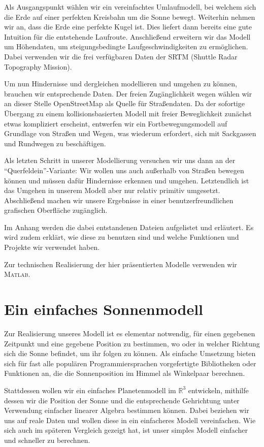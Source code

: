\documentclass[
    paper=a4,
    DIV14,
    fontsize=12pt,
    pagesize=pdftex,
    toc=bibliographynumbered
]{scrartcl}
\numberwithin{figure}{section}
\numberwithin{equation}{section}
\numberwithin{table}{section}
\newcommand*\setR{\mathds{R}}
\begin{document}
Als Ausgangspunkt wählen wir ein vereinfachtes Umlaufmodell, bei welchem sich die Erde
auf einer perfekten Kreisbahn um die Sonne bewegt. Weiterhin nehmen wir an, dass die Erde
eine perfekte Kugel ist. Dies liefert dann bereits eine gute Intuition für die
entstehende Laufroute. Anschließend erweitern wir das Modell um Höhendaten, um
steigungsbedingte Laufgeschwindigkeiten zu ermöglichen. Dabei verwenden wir die frei
verfügbaren Daten der SRTM (Shuttle Radar Topography Mission).

Um nun Hindernisse und dergleichen modellieren und umgehen zu können, brauchen wir
entsprechende Daten. Der freien Zugänglichkeit wegen wählen wir an dieser Stelle
OpenStreetMap als Quelle für Straßendaten. Da der sofortige Übergang zu einem
kollisionsbasierten Modell mit freier Beweglichkeit zunächst etwas kompliziert erscheint,
entwerfen wir ein Fortbewegungsmodell auf Grundlage von Straßen und Wegen, was wiederum
erfordert, sich mit Sackgassen und Rundwegen zu beschäftigen.

Als letzten Schritt in unserer Modellierung versuchen wir uns dann an der
\enquote{Querfeldein}-Variante: Wir wollen uns auch außerhalb von Straßen bewegen
können und müssen dafür Hindernisse erkennen und umgehen. Letztendlich ist das Umgehen in
unserem Modell aber nur relativ primitiv umgesetzt. Abschließend machen wir unsere
Ergebnisse in einer benutzerfreundlichen grafischen Oberfläche zugänglich.

Im Anhang werden die dabei entstandenen Dateien aufgelistet und erläutert. Es wird zudem
erklärt, wie diese zu benutzen sind und welche Funktionen und Projekte wir verwendet haben.

Zur technischen Realisierung der hier präsentierten Modelle verwenden wir \textsc{Matlab}.

\section{Ein einfaches Sonnenmodell}
Zur Realisierung unseres Modell ist es elementar notwendig, für einen gegebenen Zeitpunkt
und eine gegebene Position zu bestimmen, wo oder in welcher Richtung sich die Sonne
befindet, um ihr folgen zu können. Als einfache Umsetzung bieten sich für fast alle
populären Programmiersprachen vorgefertigte Bibliotheken oder Funktionen an, die die
Sonnenposition im Himmel als Winkelpaar berechnen.

Stattdessen wollen wir ein einfaches Planetenmodell im $\setR^3$ entwickeln, mithilfe
dessen wir die Position der Sonne und die entsprechende Gehrichtung unter Verwendung
einfacher linearer Algebra bestimmen können. Dabei beziehen wir uns auf reale Daten und
wollen diese in ein einfacheres Modell vereinfachen. Wie sich auch im späteren Vergleich
gezeigt hat, ist unser simples Modell einfacher und schneller zu berechnen.
\end{document}
